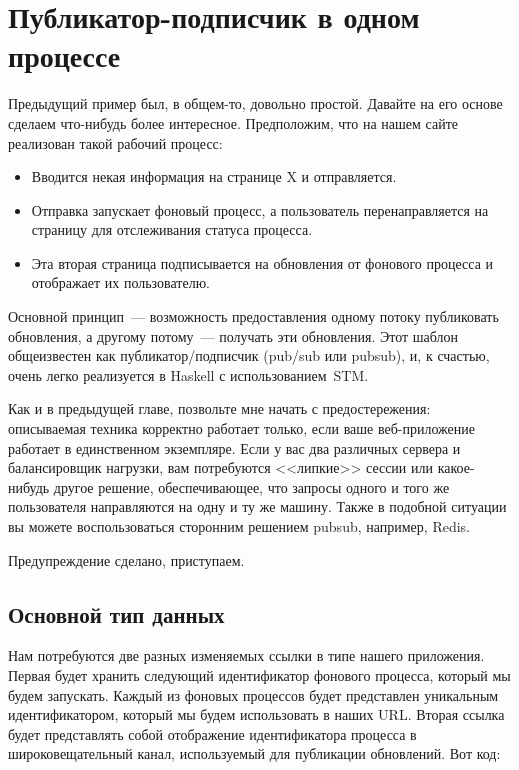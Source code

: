 \chapter{Публикатор-подписчик в одном процессе}

Предыдущий пример был, в общем-то, довольно простой. Давайте на его основе
сделаем что-нибудь более интересное. Предположим, что на нашем сайте
реализован такой рабочий процесс:
\begin{itemize}
    \item Вводится некая информация на странице X и отправляется.

    \item Отправка запускает фоновый процесс, а пользователь перенаправляется
        на страницу для отслеживания статуса процесса.

    \item Эта вторая страница подписывается на обновления от фонового
        процесса и отображает их пользователю.
\end{itemize}

Основной принцип~--- возможность предоставления одному потоку публиковать
обновления, а другому потому~--- получать эти обновления. Этот шаблон
общеизвестен как публикатор/подписчик (pub/sub или pubsub), и, к счастью, очень
легко реализуется в Haskell с использованием~STM.

Как и в предыдущей главе, позвольте мне начать с предостережения: описываемая
техника корректно работает только, если ваше веб-приложение работает в
единственном экземпляре. Если у вас два различных сервера и балансировщик
нагрузки, вам потребуются <<липкие>> сессии или какое-нибудь другое
решение, обеспечивающее, что запросы одного и того же пользователя направляются
на одну и ту же машину. Также в подобной ситуации вы можете воспользоваться
сторонним решением pubsub, например, Redis.

Предупреждение сделано, приступаем.

\section{Основной тип данных}

Нам потребуются две разных изменяемых ссылки в типе нашего приложения. Первая
будет хранить следующий идентификатор фонового процесса, который мы будем
запускать. Каждый из фоновых процессов будет представлен уникальным
идентификатором, который мы будем использовать в наших URL. Вторая ссылка будет
представлять собой отображение идентификатора процесса в широковещательный
канал, используемый для публикации обновлений. Вот код:

